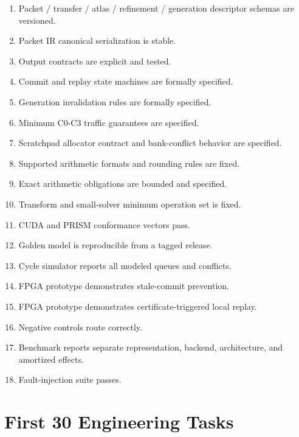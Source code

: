 \documentclass[10pt,letterpaper]{article}
\begin{document}
{{{\begin{enumerate}[label=$\square$]
\item Packet / transfer / atlas / refinement / generation descriptor schemas are versioned.
\item Packet IR canonical serialization is stable.
\item Output contracts are explicit and tested.
\item Commit and replay state machines are formally specified.
\item Generation invalidation rules are formally specified.
\item Minimum C0-C3 traffic guarantees are specified.
\item Scratchpad allocator contract and bank-conflict behavior are specified.
\item Supported arithmetic formats and rounding rules are fixed.
\item Exact arithmetic obligations are bounded and specified.
\item Transform and small-solver minimum operation set is fixed.
\item CUDA and PRISM conformance vectors pass.
\item Golden model is reproducible from a tagged release.
\item Cycle simulator reports all modeled queues and conflicts.
\item FPGA prototype demonstrates stale-commit prevention.
\item FPGA prototype demonstrates certificate-triggered local replay.
\item Negative controls route correctly.
\item Benchmark reports separate representation, backend, architecture, and amortized effects.
\item Fault-injection suite passes.
\end{enumerate}

\section{First 30 Engineering Tasks}

}}}
\end{document}
